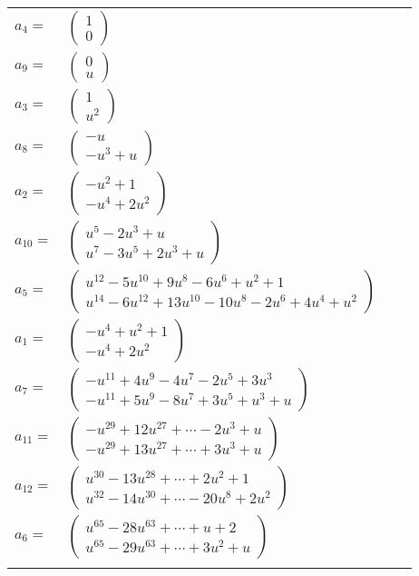 \documentclass[1p]{elsarticle_modified}
\theoremstyle{definition}
\begin{document}
\begin{tabular}{m{7pt} m{180pt} m{7pt} m{180pt} }
\flushright $a_{4}=$&$\begin{pmatrix}1\\0\end{pmatrix}$ \\
\flushright $a_{9}=$&$\begin{pmatrix}0\\u\end{pmatrix}$ \\
\flushright $a_{3}=$&$\begin{pmatrix}1\\u^2\end{pmatrix}$ \\
\flushright $a_{8}=$&$\begin{pmatrix}- u\\- u^3+u\end{pmatrix}$ \\
\flushright $a_{2}=$&$\begin{pmatrix}- u^2+1\\- u^4+2 u^2\end{pmatrix}$ \\
\flushright $a_{10}=$&$\begin{pmatrix}u^5-2 u^3+u\\u^7-3 u^5+2 u^3+u\end{pmatrix}$ \\
\flushright $a_{5}=$&$\begin{pmatrix}u^{12}-5 u^{10}+9 u^8-6 u^6+u^2+1\\u^{14}-6 u^{12}+13 u^{10}-10 u^8-2 u^6+4 u^4+u^2\end{pmatrix}$ \\
\flushright $a_{1}=$&$\begin{pmatrix}- u^4+u^2+1\\- u^4+2 u^2\end{pmatrix}$ \\
\flushright $a_{7}=$&$\begin{pmatrix}- u^{11}+4 u^9-4 u^7-2 u^5+3 u^3\\- u^{11}+5 u^9-8 u^7+3 u^5+u^3+u\end{pmatrix}$ \\
\flushright $a_{11}=$&$\begin{pmatrix}- u^{29}+12 u^{27}+\cdots-2 u^3+u\\- u^{29}+13 u^{27}+\cdots+3 u^3+u\end{pmatrix}$ \\
\flushright $a_{12}=$&$\begin{pmatrix}u^{30}-13 u^{28}+\cdots+2 u^2+1\\u^{32}-14 u^{30}+\cdots-20 u^8+2 u^2\end{pmatrix}$ \\
\flushright $a_{6}=$&$\begin{pmatrix}u^{65}-28 u^{63}+\cdots+u+2\\u^{65}-29 u^{63}+\cdots+3 u^2+u\end{pmatrix}$\\&\end{tabular}
\end{document}
